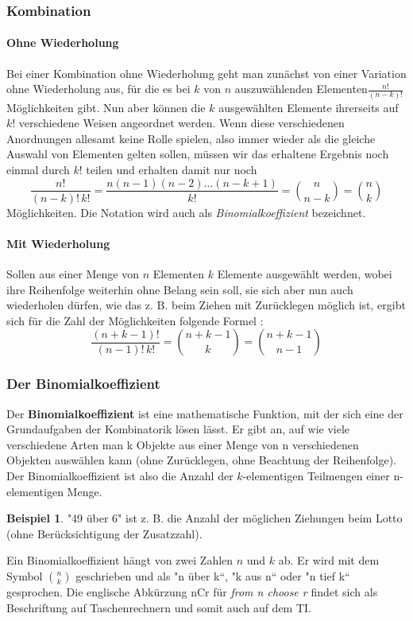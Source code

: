 \documentclass[a4paper,10pt,DIV9, BCOR12mm, oneside,openright,openbib]{scrreprt}
\theoremstyle{definition}
\newtheorem{exmp}{Beispiel}[section]
\theoremstyle{plain}
\begin{document}
\subsubsection{Kombination}
\paragraph{Ohne Wiederholung}
Bei einer Kombination ohne Wiederholung geht man zunächst von einer Variation ohne Wiederholung aus, für die es bei $ k $ von $ n $ auszuwählenden Elementen$  \tfrac{n!}{(n-k)!} $ Möglichkeiten gibt. Nun aber können die $ k $ ausgewählten Elemente ihrerseits auf $ k! $ verschiedene Weisen angeordnet werden. Wenn diese verschiedenen Anordnungen allesamt keine Rolle spielen, also immer wieder als die gleiche Auswahl von Elementen gelten sollen, müssen wir das erhaltene Ergebnis noch einmal durch $ k! $ teilen und erhalten damit nur noch
\[ \frac{n!}{(n-k)! \, k!} = \frac{n (n-1)(n-2) \ldots (n-k+1)}{k!} = \binom{n}{n-k} = \binom{n}{k} \]
Möglichkeiten. Die Notation wird auch als \textit{Binomialkoeffizient} bezeichnet.
\paragraph{Mit Wiederholung}
Sollen aus einer Menge von $ n $ Elementen $ k $ Elemente ausgewählt werden, wobei ihre Reihenfolge weiterhin ohne Belang sein soll, sie sich aber nun auch wiederholen dürfen, wie das z. B. beim Ziehen mit Zurücklegen möglich ist, ergibt sich für die Zahl der Möglichkeiten folgende Formel :
\[ \frac{(n+k-1)!}{(n-1)! \, k!} = {n+k-1 \choose k} = {n+k-1 \choose n-1} \]

\subsubsection{Der Binomialkoeffizient}
Der \textbf{Binomialkoeffizient} ist eine mathematische Funktion, mit der sich eine der Grundaufgaben der Kombinatorik lösen lässt. Er gibt an, auf wie viele verschiedene Arten man k Objekte aus einer Menge von n verschiedenen Objekten auswählen kann (ohne Zurücklegen, ohne Beachtung der Reihenfolge). Der Binomialkoeffizient ist also die Anzahl der $k$-elementigen Teilmengen einer n-elementigen Menge.
\begin{exmp}
 "49 über 6" ist z. B. die Anzahl der möglichen Ziehungen beim Lotto (ohne Berücksichtigung der Zusatzzahl).
\end{exmp}

Ein Binomialkoeffizient hängt von zwei Zahlen $n$ und $k$ ab. Er wird mit dem Symbol  $ \binom nk $ geschrieben und als "n über k“, "k aus n“ oder "n tief k“ gesprochen. Die englische Abkürzung nCr für \textit{from n choose r} findet sich als Beschriftung auf Taschenrechnern und somit auch auf dem TI.\\
\end{document}
